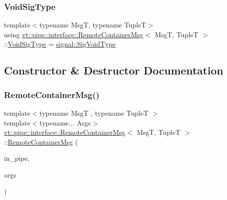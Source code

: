 \mbox{\label{structvt_1_1pipe_1_1interface_1_1_remote_container_msg_ae2139dd54fd8fb4bf561241bf03b56ec}} 
\subsubsection{\texorpdfstring{Void\+Sig\+Type}{VoidSigType}}
{\footnotesize\ttfamily template$<$typename MsgT, typename TupleT$>$ \\
using \hyperlink{structvt_1_1pipe_1_1interface_1_1_remote_container_msg}{vt\+::pipe\+::interface\+::\+Remote\+Container\+Msg}$<$ MsgT, TupleT $>$\+::\hyperlink{structvt_1_1pipe_1_1interface_1_1_remote_container_msg_ae2139dd54fd8fb4bf561241bf03b56ec}{Void\+Sig\+Type} =  \hyperlink{namespacevt_1_1pipe_1_1signal_acbe257d1ae44f20fa9fd9b6ed3057caf}{signal\+::\+Sig\+Void\+Type}}



\subsection{Constructor \& Destructor Documentation}
\mbox{\label{structvt_1_1pipe_1_1interface_1_1_remote_container_msg_a008403aabc55d4d862a5fe5b40879624}} 
\subsubsection{\texorpdfstring{Remote\+Container\+Msg()}{RemoteContainerMsg()}\hspace{0.1cm}{\footnotesize\ttfamily [1/2]}}
{\footnotesize\ttfamily template$<$typename MsgT , typename TupleT $>$ \\
template$<$typename... Args$>$ \\
\hyperlink{structvt_1_1pipe_1_1interface_1_1_remote_container_msg}{vt\+::pipe\+::interface\+::\+Remote\+Container\+Msg}$<$ MsgT, TupleT $>$\+::\hyperlink{structvt_1_1pipe_1_1interface_1_1_remote_container_msg}{Remote\+Container\+Msg} (\begin{DoxyParamCaption}\item[{\hyperlink{namespacevt_ac9852acda74d1896f48f406cd72c7bd3}{Pipe\+Type} const \&}]{in\+\_\+pipe,  }\item[{Args...}]{args }\end{DoxyParamCaption})\hspace{0.3cm}{\ttfamily [explicit]}}

